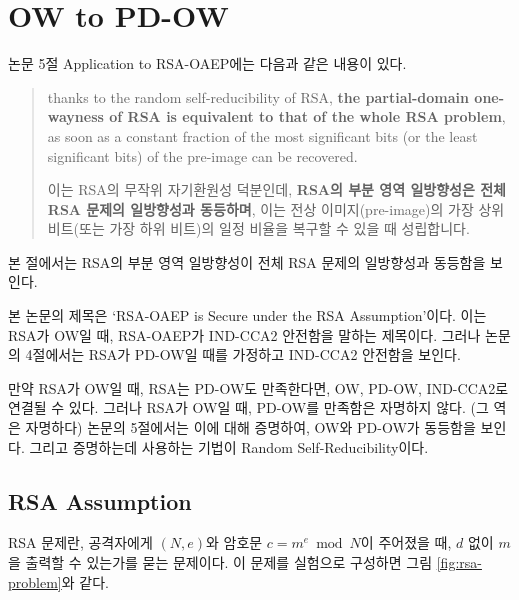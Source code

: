 \section{OW to PD-OW}

\newcommand{\PDRSA}{\textsf{PD-RSA}}

논문 5절 Application to RSA-OAEP에는 다음과 같은 내용이 있다.

\begin{quote}
    \noindent
    thanks to the random self-reducibility of RSA, \textbf{the partial-domain
    one-wayness of RSA is equivalent to that of the whole RSA problem}, as soon
    as a constant fraction of the most significant bits (or the least
    significant bits) of the pre-image can be recovered.
    
    이는 RSA의 무작위 자기환원성 덕분인데, \textbf{RSA의 부분 영역 일방향성은
    전체 RSA 문제의 일방향성과 동등하며}, 이는 전상 이미지(pre-image)의 가장
    상위 비트(또는 가장 하위 비트)의 일정 비율을 복구할 수 있을 때 성립합니다.
\end{quote}

본 절에서는 RSA의 부분 영역 일방향성이 전체 RSA 문제의 일방향성과 동등함을 보인다.

\begin{memo}
    본 논문의 제목은 `RSA-OAEP is Secure under the RSA Assumption'이다. 이는
    RSA가 OW일 때, RSA-OAEP가 IND-CCA2 안전함을 말하는 제목이다. 그러나 논문의
    4절에서는 RSA가 PD-OW일 때를 가정하고 IND-CCA2 안전함을 보인다.

    만약 RSA가 OW일 때, RSA는 PD-OW도 만족한다면, OW, PD-OW, IND-CCA2로
    연결될 수 있다. 그러나 RSA가 OW일 때, PD-OW를 만족함은 자명하지 않다. (그
    역은 자명하다) 논문의 5절에서는 이에 대해 증명하여, OW와 PD-OW가 동등함을
    보인다. 그리고 증명하는데 사용하는 기법이 Random Self-Reducibility이다.
\end{memo}

\subsection{RSA Assumption}
RSA 문제란, 공격자에게 $(N, e)$와 암호문 $c = m^e \bmod N$이 주어졌을 때, $d$
없이 $m$을 출력할 수 있는가를 묻는 문제이다. 이 문제를 실험으로 구성하면 그림
\ref{fig:rsa-problem}와 같다.

\newcommand{\RSA}{\textsf{RSA}}

